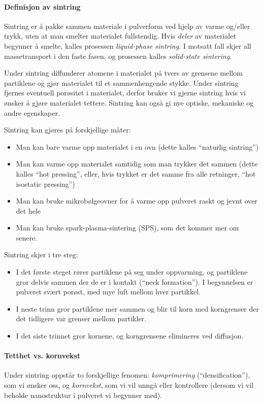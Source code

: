 \paragraph{Definisjon av sintring} Sintring er å pakke sammen materiale i pulverform ved hjelp av varme og/eller trykk, uten at man smelter materialet fullstendig. Hvis \emph{deler} av materialet begynner å smelte, kalles prosessen \emph{liquid-phase sintring}. I motsatt fall skjer all massetransport i den faste fasen, og prosessen kalles \emph{solid-state sintering}.

Under sintring diffunderer atomene i materialet på tvers av grensene mellom partiklene og gjør materialet til et sammenhengende stykke. Under sintring fjernes eventuell porøsitet i materialet, derfor bruker vi gjerne sintring hvis vi ønsker å gjøre materialet tettere. Sintring kan også gi nye optiske, mekaniske og andre egenskaper.

Sintring kan gjøres på forskjellige måter:
\begin{itemize}
	\item Man kan bare varme opp materialet i en ovn (dette kalles ``naturlig sintring'')
	\item Man kan varme opp materialet samtidig som man trykker det sammen (dette kalles ``hot pressing'', eller, hvis trykket er det samme fra alle retninger, ``hot isostatic pressing'')
	\item Man kan bruke mikrobølgeovner for å varme opp pulveret raskt og jevnt over det hele
	\item Man kan bruke spark-plasma-sintering (SPS), som det kommer mer om senere.
\end{itemize}

Sintring skjer i tre steg: 
\begin{itemize}
	\item I det første steget rører partiklene på seg under oppvarming, og partiklene gror delvis sammen der de er i kontakt (``neck formation''). I begynnelsen er pulveret svært porøst, med mye luft mellom hver partikkel.
	\item I neste trinn gror partiklene mer sammen og blir til korn med korngrenser der det tidligere var grenser mellom partikler.
	\item I det siste trinnet gror kornene, og korngrensene elimineres ved diffusjon.
\end{itemize}
 
\paragraph{Tetthet vs. kornvekst} Under sintring oppstår to forskjellige fenomen: \emph{komprimering} (``densification''), som vi ønsker oss, og \emph{kornvekst}, som vi vil unngå eller kontrollere (dersom vi vil beholde nanostruktur i pulveret vi begynner med). 

